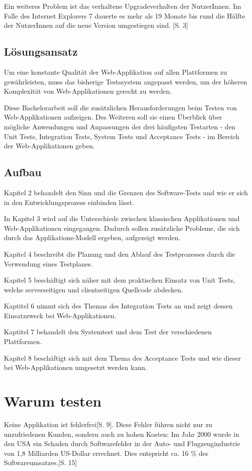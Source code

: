 \documentclass[a4paper,bibtotoc,oneside]{scrbook}
\begin{document}
Ein weiteres Problem ist das verhaltene Upgradeverhalten der NutzerInnen. Im Falle des Internet Explorers 7 dauerte es mehr als 19 Monate bis rund die Hälfte der NutzerInnen auf die neue Version umgestiegen sind. \cite{insecure}[S. 3]


\section{Lösungsansatz}
Um eine konstante Qualität der Web-Applikation auf allen Plattformen zu gewährleisten, muss das bisherige Testssystem angepasst werden, um der höheren Komplexität von Web-Applikationen gerecht zu werden. 

Diese Bachelorarbeit soll die zusätzlichen Herausforderungen beim Testen von Web-Applikationen aufzeigen. Des Weiteren soll sie einen Überblick über mögliche Anwendungen und Anpassungen der drei häufigsten Testarten - den Unit Tests, Integration Tests, System Tests und Acceptance Tests - im Bereich der Web-Applikationen geben.


\section{Aufbau}
Kapitel 2 behandelt den Sinn und die Grenzen des Software-Tests und wie er sich in den Entwicklungsprozess einbinden lässt.

In Kapitel 3 wird auf die Unterschiede zwischen klassischen Applikationen und Web-Applikationen eingegangen. Dadurch sollen zusätzliche Probleme, die sich durch das Applikations-Modell ergeben, aufgezeigt werden.

Kapitel 4 beschreibt die Planung und den Ablauf des Testprozesses durch die Verwendung eines Testplanes.


Kapitel 5 beschäftigt sich näher mit dem praktischen Einsatz von Unit Tests, welche serverseitigen und clientseitigen Quellcode abdecken.

Kaptitel 6 nimmt sich des Themas des Integration Tests an und zeigt dessen Einsatzzweck bei Web-Applikationen.

Kaptitel 7 behandelt den Systemtest und dem Test der verschiedenen Plattformen.

Kapitel 8 beschäftigt sich mit dem Thema des Acceptance Tests und wie dieser bei Web-Applikationen umgesetzt werden kann.

\chapter{Warum testen}
Keine Applikation ist fehlerfrei\cite{empiric_invest}[S. 9]. Diese Fehler  führen nicht nur zu unzufriedenen Kunden, sondern auch zu hohen Kosten: \glqq Im Jahr 2000 wurde in den USA ein Schaden durch Softwarefehler in der Auto- und Flugzeugindustrie von 1,8 Milliarden US-Dollar errechnet. Dies entspricht ca. 16 \% des Softwareumsatzes.\grqq\cite{betrieb}[S. 15]
\end{document}
